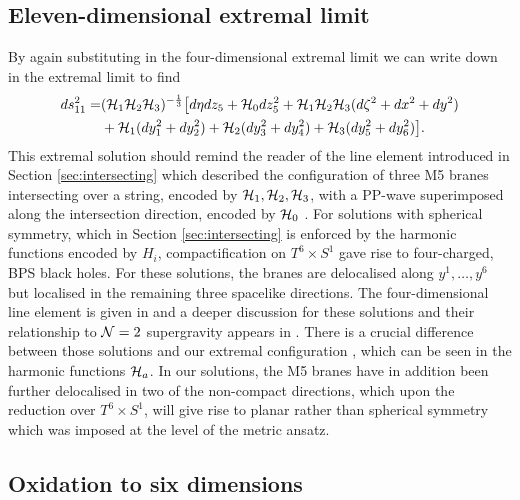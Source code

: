 \subsection*{Eleven-dimensional extremal limit}
By again substituting in the four-dimensional extremal limit  we can write down  in the extremal limit to find
\begin{equation}
\begin{aligned}
\label{eq:11dstuextremal}
    ds_{11}^2 = &({\cal H}_1{\cal H}_2{\cal H}_3)^{-\frac{1}{3}} \big[ d\eta dz_5 + {\cal H}_0 dz_5^2 + {\cal H}_1{\cal H}_2{\cal H}_3 (d\zeta^2 + dx^2 + dy^2) \\
    &+ {\cal H}_1(dy_1^2 + dy_2^2) + {\cal H}_2(dy_3^2 + dy_4^2) + {\cal H}_3(dy_5^2 + dy_6^2) \big].
\end{aligned}
\end{equation}
This extremal solution should remind the reader of the line element  introduced in Section \ref{sec:intersecting} which described the configuration of three M5 branes intersecting over a string, encoded by ${\cal H}_1, {\cal H}_2,{\cal H}_3$, with a PP-wave superimposed along the intersection direction, encoded by ${\cal H}_0$ \cite{Tseytlin:1996bh}. For solutions with spherical symmetry, which in Section \ref{sec:intersecting} is enforced by the harmonic functions encoded by $H_i$, compactification on $T^6 \times S^1$ gave rise to four-charged, BPS black holes. For these solutions, the branes are delocalised along $y^1, \ldots, y^6$ but localised in the remaining three spacelike directions. The four-dimensional line element is given in  and a deeper discussion for these solutions and their relationship to ${\cal N} = 2$ supergravity appears in \cite{Behrndt:1996jn}. There is a crucial difference between those solutions and our extremal configuration , which can be seen in the harmonic functions ${\cal H}_a$. In our solutions, the M5 branes have in addition been further delocalised in two of the non-compact directions, which upon the reduction over $T^6 \times S^1$, will give rise to planar rather than spherical symmetry which was imposed at the level of the metric ansatz. 

\subsection{Oxidation to six dimensions}

